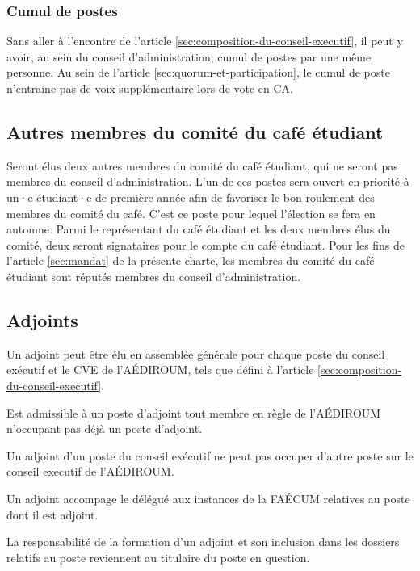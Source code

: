 \documentclass{aediroum}
\newcommand{\article}[1]{article \ref{#1}}
\begin{document}
\subsubsection{Cumul de postes}\label{sec:cumul-de-postes}

Sans aller à l'encontre de l'\article{sec:composition-du-conseil-executif}, il peut y avoir, au sein du conseil d'administration, cumul de postes par une même personne. Au sein de l'\article{sec:quorum-et-participation}, le cumul de poste n'entraine pas de voix supplémentaire lors de vote en CA.

\subsection{Autres membres du comité du café étudiant}\label{sec:autres-membres-du-comite-du-cafe-etudiant}

Seront élus deux autres membres du comité du café étudiant, qui ne seront pas membres du conseil d'administration. L'un de ces postes sera ouvert en priorité à un·e étudiant·e de première année afin de favoriser le bon roulement des membres du comité du café. C'est ce poste pour lequel l'élection se fera en automne. Parmi le représentant du café étudiant et les deux membres élus du comité, deux seront signataires pour le compte du café étudiant. Pour les fins de l'\article{sec:mandat} de la présente charte, les membres du comité du café étudiant sont réputés membres du conseil d'administration.

\subsection{Adjoints}\label{sec:adjoints}

Un adjoint peut être élu en assemblée générale pour chaque poste du conseil exécutif et le CVE de l'AÉDIROUM, tels que défini à l'\article{sec:composition-du-conseil-executif}.

Est admissible à un poste d'adjoint tout membre en règle de l'AÉDIROUM n'occupant pas déjà un poste d'adjoint.

Un adjoint d'un poste du conseil exécutif ne peut pas occuper d'autre poste sur le conseil executif de l'AÉDIROUM.

Un adjoint accompage le délégué aux instances de la FAÉCUM relatives au poste dont il est adjoint.

La responsabilité de la formation d'un adjoint et son inclusion dans les dossiers relatifs au poste reviennent au titulaire du poste en question.
\end{document}

